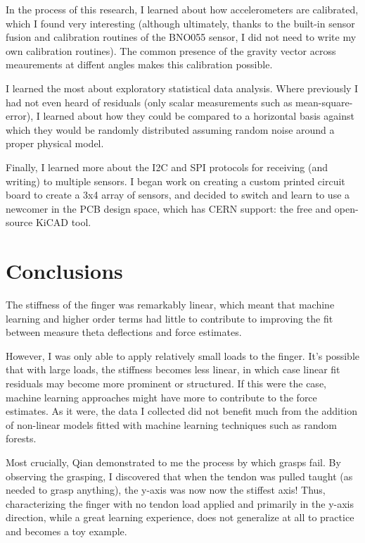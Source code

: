 \documentclass[preprint,12pt,3p]{elsarticle}
\begin{document}
In the process of this research, I learned about how accelerometers are calibrated, which I found
very interesting (although ultimately, thanks to the built-in sensor fusion and calibration routines of the BNO055
sensor, I did not need to write my own calibration routines). The common presence of the gravity
vector across meaurements at diffent angles makes this calibration possible.

I learned the most about exploratory statistical data analysis. Where previously I had not even
heard of residuals (only scalar measurements such as mean-square-error), I learned about how they
could be compared to a horizontal basis against which they would be randomly distributed assuming
random noise around a proper physical model.

Finally, I learned more about the I2C and SPI protocols for receiving (and writing) to multiple
sensors. I began work on creating a custom printed circuit board to create a 3x4 array of sensors,
and decided to switch and learn to use a newcomer in the PCB design space, which has CERN support: the free and open-source
KiCAD tool.

\section{Conclusions}

The stiffness of the finger was remarkably linear, which meant that machine learning and higher
order terms had little to contribute to improving the fit between measure theta deflections and
force estimates.

However, I was only able to apply relatively small loads to the finger. It's possible that with
large loads, the stiffness becomes less linear, in which case linear fit residuals may become more
prominent or structured. If this were the case, machine learning approaches might have more to
contribute to the force estimates. As it were, the data I collected did not benefit much from the
addition of non-linear models fitted with machine learning techniques such as random forests.

Most crucially, Qian demonstrated to me the process by which grasps fail. By observing the grasping,
I discovered that when the tendon was pulled taught (as needed to grasp anything), the y-axis was now
now the stiffest axis! Thus, characterizing the finger with no tendon load applied and primarily in
the y-axis direction, while a great learning experience, does not generalize at all to practice and becomes a
toy example.
\end{document}
